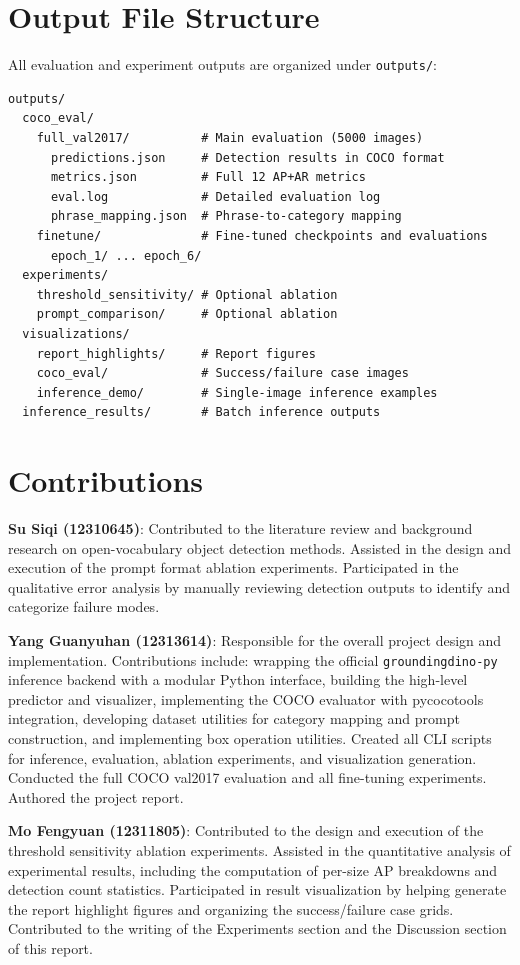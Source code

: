 \documentclass[10pt,journal,final,twocolumn]{IEEEtran}
\begin{document}
\section{Output File Structure}

All evaluation and experiment outputs are organized under \texttt{outputs/}:

\begin{lstlisting}[style=bashstyle]
outputs/
  coco_eval/
    full_val2017/          # Main evaluation (5000 images)
      predictions.json     # Detection results in COCO format
      metrics.json         # Full 12 AP+AR metrics
      eval.log             # Detailed evaluation log
      phrase_mapping.json  # Phrase-to-category mapping
    finetune/              # Fine-tuned checkpoints and evaluations
      epoch_1/ ... epoch_6/
  experiments/
    threshold_sensitivity/ # Optional ablation
    prompt_comparison/     # Optional ablation
  visualizations/
    report_highlights/     # Report figures
    coco_eval/             # Success/failure case images
    inference_demo/        # Single-image inference examples
  inference_results/       # Batch inference outputs
\end{lstlisting}

\section*{Contributions}

\textbf{Su Siqi (12310645)}: Contributed to the literature review and background research on open-vocabulary object detection methods. Assisted in the design and execution of the prompt format ablation experiments. Participated in the qualitative error analysis by manually reviewing detection outputs to identify and categorize failure modes.

\textbf{Yang Guanyuhan (12313614)}: Responsible for the overall project design and implementation. Contributions include: wrapping the official \texttt{groundingdino-py} inference backend with a modular Python interface, building the high-level predictor and visualizer, implementing the COCO evaluator with pycocotools integration, developing dataset utilities for category mapping and prompt construction, and implementing box operation utilities. Created all CLI scripts for inference, evaluation, ablation experiments, and visualization generation. Conducted the full COCO val2017 evaluation and all fine-tuning experiments. Authored the project report.

\textbf{Mo Fengyuan (12311805)}: Contributed to the design and execution of the threshold sensitivity ablation experiments. Assisted in the quantitative analysis of experimental results, including the computation of per-size AP breakdowns and detection count statistics. Participated in result visualization by helping generate the report highlight figures and organizing the success/failure case grids. Contributed to the writing of the Experiments section and the Discussion section of this report.
\end{document}
